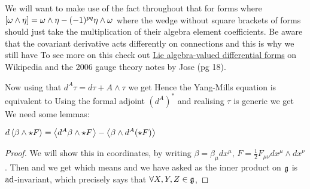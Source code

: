 \documentclass{article}
\begin{document}
\begin{remark}
	We will want to make use of the fact throughout that for forms 
where $\left[ \omega \wedge \eta \right] = \omega \wedge \eta - (-1)^{pq} \eta \wedge \omega$ where the wedge without square brackets of forms should just take the multiplication of their algebra element coefficients. Be aware that the covariant derivative acts differently on connections and this is why we still have 
To see more on this check out \href{https://en.wikipedia.org/wiki/Lie_algebra-valued_differential_form}{Lie algebra-valued differential forms} on Wikipedia and the 2006 gauge theory notes by Jose (pg 18).  
\end{remark}
Now using that $d^A \tau  = d\tau + A \wedge \tau$ we get 
Hence the Yang-Mills equation is equivalent to 
Using the formal adjoint $(d^A)^\ast$ and realising $\tau$ is generic we get 
We need some lemmas:
\begin{lemma} $ d\left\langle \beta \wedge \star F \right\rangle = \left\langle d^A\beta \wedge \star F \right\rangle - \left\langle \beta \wedge d^A(\star F) \right\rangle $
\end{lemma}
\begin{proof}
	We will show this in coordinates, by writing $\beta = \beta_\mu dx^\mu, \, F = \frac{1}{2}F_{\mu\nu} dx^\mu \wedge dx^\nu$. Then 
	and we get 
	which means 
	and we have asked as the inner product on $\mathfrak{g}$ is $\operatorname{ad}$-invariant, which precisely says that $\forall X,Y,Z \in \mathfrak{g}$, 
\end{proof}
\end{document}

